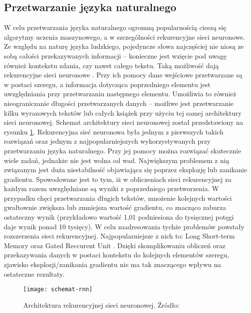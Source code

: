 \subsection{Przetwarzanie języka naturalnego}
W celu przetwarzania języka naturalnego ogromną popularnością cieszą się algorytmy uczenia maszynowego, a w szczególności rekurencyjne sieci neuronowe. Ze względu na naturę języka ludzkiego, pojedyncze słowa najczęściej nie niosą ze sobą całości przekazywanych informacji -- konieczne jest wzięcie pod uwagę również kontekstu zdania, czy nawet całego tekstu. Taką możliwość dają rekurencyjne sieci neuronowe \cite{rnn}. Przy ich pomocy dane wejściowe przetwarzane są w postaci szeregu, a informacja dotycząca poprzedniego elementu jest uwzględniania przy przetwarzaniu następnego elementu. Umożliwia to również nieograniczanie długości przetwarzanych danych -- możliwe jest przetwarzanie kilku wyrazowych tekstów lub całych książek przy użyciu tej samej architektury sieci neuronowej. Schemat architektury sieci neuronowej został przedstawiony na rysunku \ref{fig:schemat-rnn}. Rekurencyjna sieć neuronowa była jednym z pierwszych takich rozwiązań oraz jednym z najpopularniejszych wykorzystywanych przy przetwarzaniu języka naturalnego. Przy jej pomocy można rozwiązać skutecznie wiele zadań, jednakże nie jest wolna od wad. Największym problemem z nią związanym jest duża niestabilność objawiająca się poprzez eksplozję lub zanikanie gradientu. Spowodowane jest to tym, iż w obliczeniach sieci rekurencyjnej za każdym razem uwzględniane są wyniki z poprzedniego przetworzenia. W przypadku chęci przetwarzania długich tekstów, mnożenie kolejnych wartości gwałtownie zwiększa lub zmniejsza wartość gradientu, co znacząco zaburza ostateczny wynik (przykładowo wartość 1,01 podniesiona do tysięcznej potęgi daje wynik ponad 10 tysięcy). W celu zaadresowania tychże problemów powstały rozszerzenia sieci rekurencyjnej. Najpopularniejsze z nich to: Long Short-term Memory \cite{lstm} oraz Gated Reccurent Unit \cite{gru}. Dzięki skomplikowaniu obliczeń oraz przekazywania danych w postaci kontekstu do kolejnych elementów szeregu, zjawisko eksplozji/zanikania gradientu nie ma tak znaczącego wpływu na ostateczne rezultaty.
\begin{figure}[!h]
  \centering
  \texttt{[image: schemat-rnn]}
  \caption{Architektura rekurencyjnej sieci neuronowej. Źródło: \cite{WikipediaEN:RNN}}
  \label{fig:schemat-rnn}
\end{figure}
